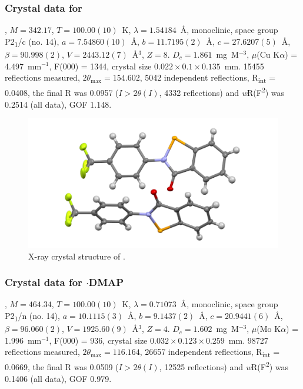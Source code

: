 \begin{refsection}
\subsubsection{Crystal data for \texorpdfstring{}{C14 H8 F3 N O Se}}
, $M=342.17$, $T=100.00(10)$~K, $\lambda=1.54184$~\AA, monoclinic, space group P2\textsubscript{1}/c (no. 14), $a = 7.54860(10)$~\AA, $b = 11.7195(2)$~\AA, $c = 27.6207(5)$~\AA, $\beta = 90.998(2)$\degree, $V = 2443.12(7)$~\AA$^{3}$, $Z = 8$. $D_{c}= 1.861$~mg~M$^{-3}$, $\mu$(Cu K$\alpha$) = 4.497~mm$^{-1}$, F(000) = 1344, crystal size $0.022 \times 0.1 \times 0.135$~mm. 15455 reflections measured, $2\theta_{\mathrm{max}}=154.602$\degree, 5042 independent reflections, R\textsubscript{int} = 0.0408, the final R was 0.0957 ($I > 2\theta(I)$, 4332 reflections) and \emph{w}R(F\textsuperscript{2}) was 0.2514 (all data), GOF 1.148.

\begin{figure}
  \includegraphics[width=0.6\linewidth]{Figures/ebs-4cf3-xtal.pdf}
  \caption{X-ray crystal structure of \texorpdfstring{}{C14 H8 F3 N O Se}.}
\end{figure}

\subsubsection{Crystal data for \texorpdfstring{$\cdot$DMAP}{C21 H18 F3 N3 O Se}}
, $M=464.34$, $T=100.00(10)$~K, $\lambda=0.71073$~\AA, monoclinic, space group P2\textsubscript{1}/n (no. 14), $a = 10.1115(3)$~\AA, $b = 9.1437(2)$~\AA, $c = 20.9441(6)$~\AA, $\beta = 96.060(2)$\degree, $V = 1925.60(9)$~\AA$^{3}$, $Z = 4$. $D_{c}= 1.602$~mg~M$^{-3}$, $\mu$(Mo K$\alpha$) = 1.996~mm$^{-1}$, F(000) = 936, crystal size $0.032 \times 0.123 \times 0.259$~mm. 98727 reflections measured, $2\theta_{\mathrm{max}}=116.164$\degree, 26657 independent reflections, R\textsubscript{int} = 0.0669, the final R was 0.0509 ($I > 2\theta(I)$, 12525 reflections) and \emph{w}R(F\textsuperscript{2}) was 0.1406 (all data), GOF 0.979.


\end{refsection}
